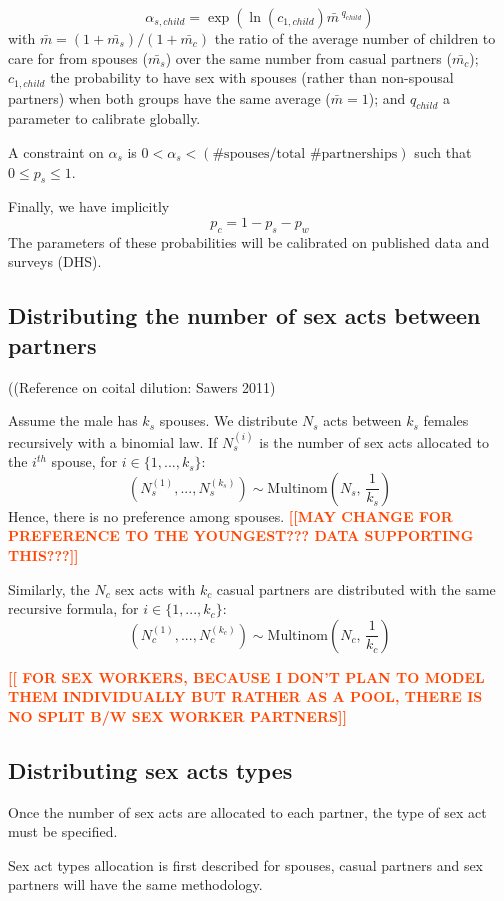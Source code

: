 \documentclass[11pt, onecolumn]{article}
\newcommand{\warning}[1]{\textbf{\textcolor{OrangeRed}{#1}}}
\begin{document}
$$ \alpha_{s,child} = \exp(\ln(c_{1,child}) \bar{m\,}^{q_{child}})$$
with $\bar{m} = (1+\bar{m_s})/(1+\bar{m_c})$ the ratio of the average number of children to care for from spouses ($\bar{m_s}$) over the same number from casual partners  ($\bar{m_c}$); $c_{1,child}$ the probability to have sex with spouses (rather than non-spousal partners) when both groups have the same average ($\bar{m}=1$); and $q_{child}$ a parameter to calibrate globally.


A constraint on $\alpha_s$ is $0<\alpha_s<(\text{\# spouses} / \text{total \# partnerships})$ such that $0\leq p_s \leq 1$. 


 Finally, we have implicitly
$$p_c = 1-p_s-p_w$$
The parameters of these probabilities will be calibrated on published data and surveys (DHS).

\subsection{Distributing the number of sex acts between partners}

((Reference on coital dilution: Sawers 2011)

Assume the male has $k_s$ spouses. We distribute $N_s$ acts between $k_s$ females recursively with a binomial law. If $N^{(i)}_s$ is the number of sex acts allocated to the $i^{th}$ spouse, for $i \in \{1,...,k_s\}$:
$$ \left(N^{(1)}_s,...,N^{(k_s)}_s \right)\sim \mathrm{Multinom}\left(N_s, \, \frac{1}{k_s}\right)$$
Hence, there is no preference among spouses. 
\warning{[[MAY CHANGE FOR PREFERENCE TO THE YOUNGEST??? DATA SUPPORTING THIS???]]}

Similarly, the $N_c$ sex acts with $k_c$ casual partners are distributed with the same recursive formula, for $i \in \{1,...,k_c\}$:
$$ \left(N^{(1)}_c,...,N^{(k_c)}_c \right)\sim \mathrm{Multinom}\left(N_c, \, \frac{1}{k_c}\right)$$

\warning{[[ FOR SEX WORKERS, BECAUSE I DON'T PLAN TO MODEL THEM INDIVIDUALLY BUT RATHER AS A POOL, THERE IS NO SPLIT B/W SEX WORKER PARTNERS]]}

\subsection{Distributing sex acts types}

Once the number of sex acts are allocated to each partner, the type of sex act must be specified.

Sex act types allocation is first described for spouses, casual partners and sex partners will have the same methodology.
\end{document}
